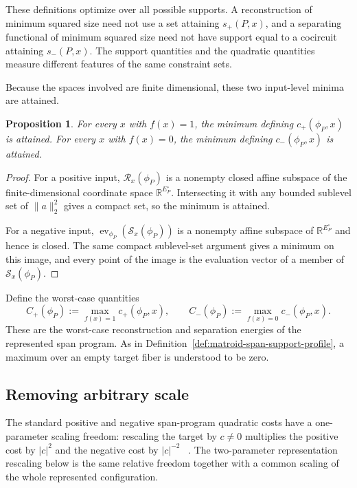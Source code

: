 \documentclass[11pt]{article}
\numberwithin{equation}{section}
\newtheorem{proposition}[definition]{Proposition}
\theoremstyle{remark}
\begin{document}
These definitions optimize over all possible supports. A reconstruction of
minimum squared size need not use a set attaining $s_+(P,x)$, and a
separating functional of minimum squared size need not have support equal to a
cocircuit attaining $s_-(P,x)$. The support quantities and the quadratic
quantities measure different features of the same constraint sets.

Because the spaces involved are finite dimensional, these two input-level
minima are attained.

\begin{proposition}
\label{prop:representation-energy-attainment}
For every $x$ with $f(x)=1$, the minimum defining
$c_+(\phi_P,x)$ is attained. For every $x$ with $f(x)=0$, the minimum
defining $c_-(\phi_P,x)$ is attained.
\end{proposition}

\begin{proof}
For a positive input, $\mathcal R_x(\phi_P)$ is a nonempty closed affine
subspace of the finite-dimensional coordinate space
$\mathbb R^{E_P^\circ}$. Intersecting it with any bounded sublevel set of
$\|a\|_2^2$ gives a compact set, so the minimum is attained.

For a negative input,
$\operatorname{ev}_{\phi_P}(\mathcal S_x(\phi_P))$ is a nonempty affine
subspace of $\mathbb R^{E_P^\circ}$ and hence is closed. The same compact
sublevel-set argument gives a minimum on this image, and every point of the
image is the evaluation vector of a member of $\mathcal S_x(\phi_P)$.
\end{proof}

Define the worst-case quantities
\begin{equation}
    C_+(\phi_P):=\max_{f(x)=1}c_+(\phi_P,x),
    \qquad
    C_-(\phi_P):=\max_{f(x)=0}c_-(\phi_P,x).
\end{equation}
These are the worst-case reconstruction and separation energies of the
represented span program.
As in Definition~\ref{def:matroid-span-support-profile}, a maximum over an
empty target fiber is understood to be zero.

\subsection{Removing arbitrary scale}
\label{subsec:representation-balancing}

The standard positive and negative span-program quadratic costs have a
one-parameter scaling freedom: rescaling the target by $c\neq0$ multiplies
the positive cost by $|c|^2$ and the negative cost by $|c|^{-2}$
~\cite{ReichardtSpalek2008,Reichardt2009}. The two-parameter representation
rescaling below is the same relative freedom together with a common scaling
of the whole represented configuration.
\end{document}
